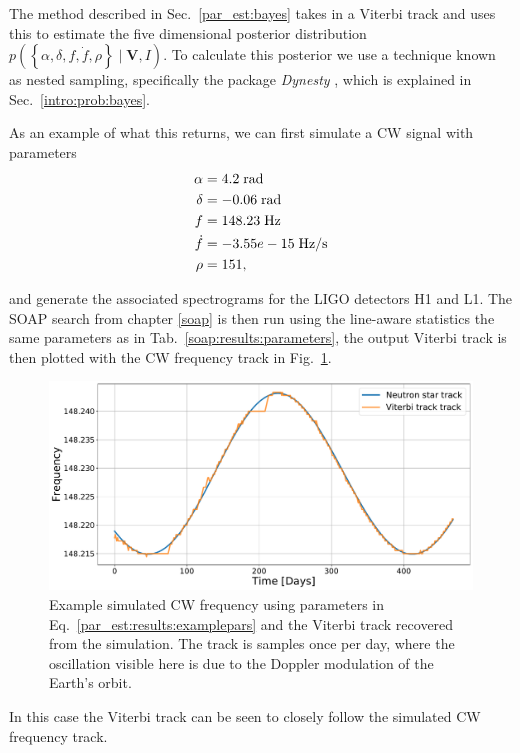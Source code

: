 The method described in Sec.~\ref{par_est:bayes} takes in a Viterbi track and uses this to estimate the five dimensional posterior distribution $p\left(\left\{ \alpha, \delta, f, \dot{f}, \rho \right\} \mid \bm{V}, I \right)$.
To calculate this posterior we use a technique known as nested sampling, specifically the package {\it Dynesty} \citep{speagle2019DynestyDynamic}, which is explained in Sec.~\ref{intro:prob:bayes}. 

As an example of what this returns, we can first simulate a \gls{CW} signal with parameters 
\begin{equation}
    \label{par_est:results:examplepars}
    \begin{split}
        \alpha &= 4.2 \; \rm{rad}\\
        \delta &= -0.06 \; \rm{rad} \\
        f &= 148.23 \; \rm{Hz}\\
        \dot{f} &= -3.55e-15 \; \rm{Hz/s}\\
        \rho &= 151,\\
    \end{split}
\end{equation}

and generate the associated spectrograms for the \gls{LIGO} detectors H1 and L1.
The SOAP search from chapter \ref{soap} is then run using the line-aware statistics the same parameters as in Tab.~\ref{soap:results:parameters}, the output Viterbi track is then plotted with the \gls{CW} frequency track in Fig.~\ref{par_est:results:freqtrack}. 
%
\begin{figure}[ht]

    \centering
    \includegraphics[width=\linewidth]{C5_parameter/example_freqtrack.pdf}
    \caption[Frequency track of injected signal]{ Example simulated \gls{CW} frequency using parameters in Eq.~\ref{par_est:results:examplepars} and the Viterbi track recovered from the simulation. The track is samples once per day, where the oscillation visible here is due to the Doppler modulation of the Earth's orbit.}
    \label{par_est:results:freqtrack}
    
\end{figure}
%
In this case the Viterbi track can be seen to closely follow the simulated \gls{CW} frequency track.

